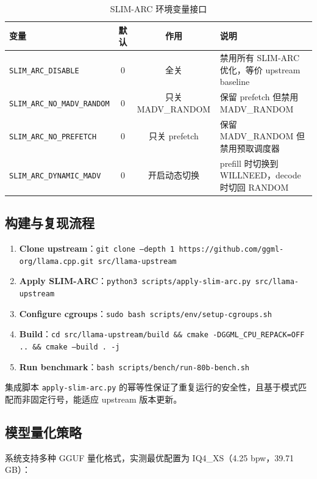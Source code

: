 \begin{table}[H]
    \centering
    \caption{SLIM-ARC 环境变量接口}
    \label{tab:env_vars}
    \begin{tabular}{lccp{6cm}}
        \toprule
        \textbf{变量} & \textbf{默认} & \textbf{作用} & \textbf{说明} \\
        \midrule
        \texttt{SLIM\_ARC\_DISABLE} & 0 & 全关 & 禁用所有 SLIM-ARC 优化，等价 upstream baseline \\
        \texttt{SLIM\_ARC\_NO\_MADV\_RANDOM} & 0 & 只关 MADV\_RANDOM & 保留 prefetch 但禁用 MADV\_RANDOM \\
        \texttt{SLIM\_ARC\_NO\_PREFETCH} & 0 & 只关 prefetch & 保留 MADV\_RANDOM 但禁用预取调度器 \\
        \texttt{SLIM\_ARC\_DYNAMIC\_MADV} & 0 & 开启动态切换 & prefill 时切换到 WILLNEED，decode 时切回 RANDOM \\
        \bottomrule
    \end{tabular}
\end{table}

\subsection{构建与复现流程}

\begin{enumerate}
    \item \textbf{Clone upstream}：\texttt{git clone --depth 1 https://github.com/ggml-org/llama.cpp.git src/llama-upstream}
    \item \textbf{Apply SLIM-ARC}：\texttt{python3 scripts/apply-slim-arc.py src/llama-upstream}
    \item \textbf{Configure cgroups}：\texttt{sudo bash scripts/env/setup-cgroups.sh}
    \item \textbf{Build}：\texttt{cd src/llama-upstream/build \&\& cmake -DGGML\_CPU\_REPACK=OFF .. \&\& cmake --build . -j}
    \item \textbf{Run benchmark}：\texttt{bash scripts/bench/run-80b-bench.sh}
\end{enumerate}

集成脚本 \texttt{apply-slim-arc.py} 的幂等性保证了重复运行的安全性，且基于模式匹配而非固定行号，能适应 upstream 版本更新。

\subsection{模型量化策略}

系统支持多种 GGUF 量化格式，实测最优配置为 IQ4\_XS（4.25 bpw，39.71\,GB）：

